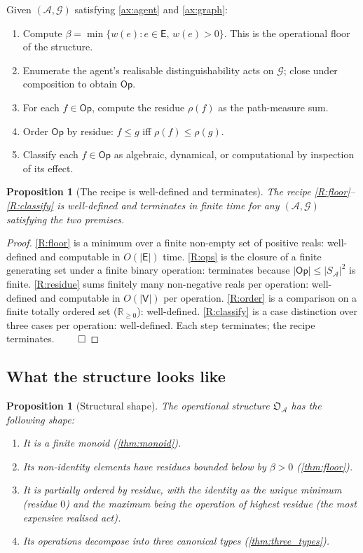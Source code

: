 \documentclass[11pt,a4paper]{article}
\theoremstyle{thmstyle}
\newtheorem{proposition}[theorem]{Proposition}
\theoremstyle{definition}
\theoremstyle{remark}
\newcommand{\R}{\mathbb{R}}
\newcommand{\Graph}{\mathcal{G}}
\newcommand{\Vrt}{\mathsf{V}}
\newcommand{\Edg}{\mathsf{E}}
\newcommand{\Agent}{\mathcal{A}}
\newcommand{\Op}{\mathsf{Op}}
\newcommand{\Res}{\rho}
\newcommand{\floor}{\beta}
\newcommand{\OpStr}{\mathfrak{O}}
\begin{document}
Given $(\Agent, \Graph)$ satisfying \cref{ax:agent} and
\cref{ax:graph}:
\begin{enumerate}[label=(R\arabic*),leftmargin=2.6em,nosep]
\item\label{R:floor} Compute $\floor = \min \{w(e) : e \in \Edg,\,
w(e) > 0\}$. This is the operational floor of the structure.
\item\label{R:ops} Enumerate the agent's realisable
distinguishability acts on $\Graph$; close under composition to
obtain $\Op$.
\item\label{R:residue} For each $f \in \Op$, compute the residue
$\Res(f)$ as the path-measure sum.
\item\label{R:order} Order $\Op$ by residue: $f \leq g$ iff
$\Res(f) \leq \Res(g)$.
\item\label{R:classify} Classify each $f \in \Op$ as algebraic,
dynamical, or computational by inspection of its effect.
\end{enumerate}

\begin{proposition}[The recipe is well-defined and terminates]
\label{prop:recipe}
The recipe \ref{R:floor}--\ref{R:classify} is well-defined and
terminates in finite time for any $(\Agent, \Graph)$ satisfying the
two premises.
\end{proposition}

\begin{proof}
\ref{R:floor} is a minimum over a finite non-empty set of positive
reals: well-defined and computable in $O(|\Edg|)$ time.
\ref{R:ops} is the closure of a finite generating set under a
finite binary operation: terminates because
$|\Op| \leq |S_\Agent|^2$ is finite.
\ref{R:residue} sums finitely many non-negative reals per
operation: well-defined and computable in $O(|\Vrt|)$ per operation.
\ref{R:order} is a comparison on a finite totally ordered set
($\R_{\geq 0}$): well-defined.
\ref{R:classify} is a case distinction over three cases per
operation: well-defined.
Each step terminates; the recipe terminates. $\qed$
\end{proof}

\subsection{What the structure looks like}

\begin{proposition}[Structural shape]
\label{prop:shape}
The operational structure $\OpStr_\Agent$ has the following shape:
\begin{enumerate}[nosep,leftmargin=*]
\item It is a finite monoid (\cref{thm:monoid}).
\item Its non-identity elements have residues bounded below by
$\floor > 0$ (\cref{thm:floor}).
\item It is partially ordered by residue, with the identity as the
unique minimum (residue $0$) and the maximum being the operation of
highest residue (the most expensive realised act).
\item Its operations decompose into three canonical types
(\cref{thm:three_types}).
\end{enumerate}
\end{proposition}
\end{document}
